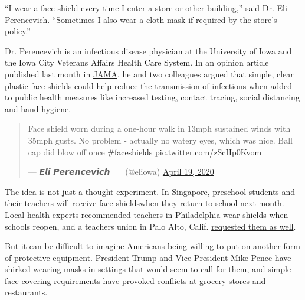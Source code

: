 ``I wear a face shield every time I enter a store or other building,''
said Dr. Eli Perencevich. ``Sometimes I also wear a cloth
\href{https://www.nytimes3xbfgragh.onion/2020/06/02/health/coronavirus-face-masks-surveys.html}{mask}
if required by the store's policy.''

Dr. Perencevich is an infectious disease physician at the University of
Iowa and the Iowa City Veterans Affairs Health Care System. In an
opinion article published last month in
\href{https://jamanetwork.com/journals/jama/fullarticle/2765525}{JAMA},
he and two colleagues argued that simple, clear plastic face shields
could help reduce the transmission of infections when added to public
health measures like increased testing, contact tracing, social
distancing and hand hygiene.

\begin{quote}
Face shield worn during a one-hour walk in 13mph sustained winds with
35mph gusts. No problem - actually no watery eyes, which was nice. Ball
cap did blow off once
\href{https://twitter.com/hashtag/faceshields?src=hash\&ref_src=twsrc\%5Etfw}{\#faceshields}
\href{https://t.co/zScHp0Kvom}{pic.twitter.com/zScHp0Kvom}

--- 𝙀𝙡𝙞 𝙋𝙚𝙧𝙚𝙣𝙘𝙚𝙫𝙞𝙘𝙝 🤚 🧼😷 (@eliowa)
\href{https://twitter.com/eliowa/status/1251907985527517186?ref_src=twsrc\%5Etfw}{April
19, 2020}
\end{quote}

The idea is not just a thought experiment. In Singapore, preschool
students and their teachers will receive
\href{https://www.channelnewsasia.com/news/singapore/covid-19-face-shield-hand-sanitiser-students-school-reopen-12759972}{face
shields}when they return to school next month. Local health experts
recommended
\href{https://wskg.org/news/playbook-for-reopening-pa-schools-face-shields-staggered-schedules-temp-checks/}{teachers
in Philadelphia wear shields} when schools reopen, and a teachers union
in Palo Alto, Calif.
\href{https://paloaltoonline.com/news/2020/05/22/face-shields-and-testing-teachers-union-asks-for-protection-flexibility-in-working-conditions-this-fall}{requested
them as well}.

But it can be difficult to imagine Americans being willing to put on
another form of protective equipment.
\href{https://www.nytimes3xbfgragh.onion/video/us/politics/100000007124695/trump-coronavirus-mask-factory.html}{President
Trump} and
\href{https://www.nytimes3xbfgragh.onion/2020/04/28/us/politics/coronavirus-pence-mask.html}{Vice
President Mike Pence} have shirked wearing masks in settings that would
seem to call for them, and simple
\href{https://www.nytimes3xbfgragh.onion/2020/05/15/us/coronavirus-masks-violence.html}{face
covering requirements have provoked conflicts} at grocery stores and
restaurants.

